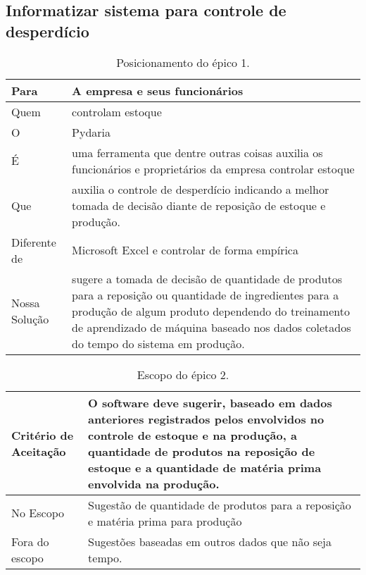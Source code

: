 \subsection{Informatizar sistema para controle de desperdício}
	\begin{table}[htb]
    \begin{tabular}{|l|l|}
        \hline
        Para          & {\parbox{12cm}{A empresa e seus funcionários}} \\ \hline
        Quem          & {\parbox{12cm}{controlam estoque}}                                                      \\ \hline
        O             & {\parbox{12cm}{Pydaria}}                                                               \\ \hline
        É             & {\parbox{12cm}{uma ferramenta que dentre outras coisas auxilia os funcionários e proprietários da empresa controlar estoque}}                                \\ \hline
        Que           & {\parbox{12cm}{auxilia o controle de desperdício indicando a melhor tomada de decisão diante de reposição de estoque e produção.}} \\ \hline
        Diferente de  & {\parbox{12cm}{Microsoft Excel e controlar de forma empírica  }}                                                    \\ \hline
        Nossa Solução & {\parbox{12cm}{sugere a tomada de decisão de quantidade de produtos para a reposição ou quantidade de ingredientes para a produção de algum produto dependendo do treinamento de aprendizado de máquina baseado nos dados coletados do tempo do sistema em produção.}}                          \\
        \hline
    \end{tabular}
    \caption{Posicionamento do épico 1.}
    \end{table}


     \begin{table}[htb]
    \begin{tabular}{|l|l|}
        \hline
        Critério de Aceitação & {\parbox{12cm}{O software deve sugerir, baseado em dados anteriores registrados pelos envolvidos no controle de estoque e na produção, a quantidade de produtos na reposição de estoque e a quantidade de matéria prima envolvida na produção.}} \\ \hline
        No Escopo             & {\parbox{12cm}{Sugestão de quantidade de produtos para a reposição e matéria prima para produção}}                                                \\ 
        Fora do escopo        & {\parbox{12cm}{Sugestões baseadas em outros dados que não seja tempo.}}                             \\
        \hline
    \end{tabular}
    \caption{Escopo do épico 2.}
	\end{table}


